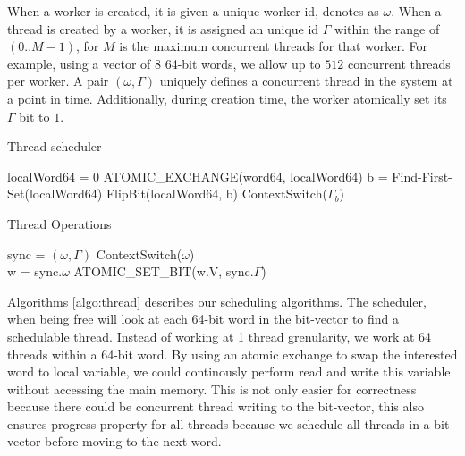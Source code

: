 \documentclass[11pt]{article}
\begin{document}
When a worker is created, it is given a unique worker id, denotes as $\omega$.
When a thread is created by a worker, it is assigned an unique id $\Gamma$
within the range of $(0..M-1)$, for $M$ is the maximum concurrent threads for
that worker.  For example, using a vector of $8$ 64-bit words, we allow up to
$512$ concurrent threads per worker. A pair $(\omega, \Gamma)$ uniquely
defines a concurrent thread in the system at a point in time. Additionally,
during creation time, the worker atomically set its $\Gamma$ bit to $1$.

\begin{algorithm}
  \caption{Thread scheduler}
  \label{algo:thread}
  \begin{algorithmic}[1]
     
     
        \State localWord64 = 0
        \State ATOMIC_EXCHANGE(word64, localWord64)
          \State b = Find-First-Set(localWord64)
          \State FlipBit(localWord64, b)
          \State ContextSwitch($\Gamma_{b}$)
        \EndWhile
      \EndIf
      \EndFor
    \EndWhile
    \EndProcedure
  \end{algorithmic}
\end{algorithm}

\begin{algorithm}
  \caption{Thread Operations}
  \label{algo:thread-ops}
  \begin{algorithmic}[1]
      
      \State sync = {$(\omega, \Gamma)$}
      \State ContextSwitch($\omega$)
    \EndProcedure
    \\ 
     
      \State w = sync.$\omega$
      \State ATOMIC_SET_BIT(w.V, sync.$\Gamma$)
    \EndProcedure
  \end{algorithmic}
\end{algorithm}

Algorithms \ref{algo:thread} describes our scheduling algorithms. The
scheduler, when being free will look at each 64-bit word in the bit-vector to
find a schedulable thread.  Instead of working at 1 thread grenularity, we work
at 64 threads within a 64-bit word. By using an atomic exchange to swap the 
interested word to local variable, we could continously perform read and write
this variable without accessing the main memory.  This is not only easier for
correctness because there could be concurrent thread writing to the bit-vector,
this also ensures progress property for all threads because we schedule all threads
in a bit-vector before moving to the next word.
\end{document}

